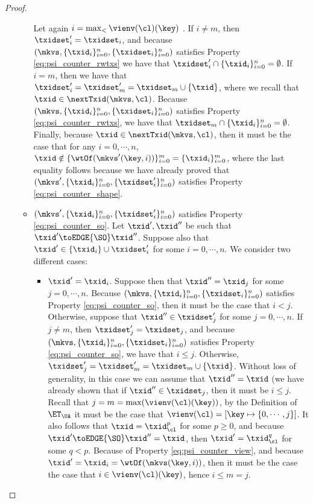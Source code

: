 \begin{proof}
\begin{itemize}
\begin{itemize}
Let again $i = \max_{<}\vienv(\cl)(\key)$ . 
If $i \neq m$, then $\txidset'_{i} = \txidset_{i}$, and because $(\mkvs,  \{\txid_{i}\}_{i=0}^{n}, \{\txidset_{i}\}_{i=0}^{n})$ 
satisfies Property \eqref{eq:psi_counter_rwtxs} 
we have that $\txidset'_{i} \cap \{\txid_{i}\}_{i=0}^{n} = \emptyset$. If $i = m$, then 
we have that $\txidset'_{i} = \txidset'_{m} = \txidset_{m} \cup \{\txid\}$, where we recall that $\txid \in \nextTxid(\mkvs, \cl)$. 
Because $(\mkvs,  \{\txid_{i}\}_{i=0}^{n}, \{\txidset_{i}\}_{i=0}^{n})$ 
satisfies Property \eqref{eq:psi_counter_rwtxs}, we have that $\txidset_{m} \cap \{\txid_{i}\}_{i=0}^{n} 
= \emptyset$. Finally, because $\txid \in \nextTxid(\mkvs,\cl)$, then it must be the case that 
for any $i = 0,\cdots, n$, $\txid \notin \{\wtOf(\mkvs'(\key,i))\}_{i=0}^{m} = \{\txid_{i}\}_{i=0}^{m}$,  
where the last equality follows because we have already proved that $(\mkvs',  \{\txid_{i}\}_{i=0}^{n}, \{\txidset'_{i}\}_{i=0}^{n})$ 
satisfies Property \eqref{eq:psi_counter_shape}.

\item $(\mkvs',  \{\txid_{i}\}_{i=0}^{n}, \{\txidset'_{i}\}_{i=0}^{n})$ satisfies Property \eqref{eq:psi_counter_so}. 
Let $\txid', \txid''$ be such that $\txid' \toEDGE{\SO} \txid''$. 
Suppose also that $\txid' \in \{\txid_{i}\} \cup \txidset'_{i}$ for some $i = 0,\cdots, n$. We consider two different cases:
\begin{itemize}
\item $\txid' = \txid_{i}$. Suppose then that $\txid'' = \txid_{j}$ for some $j = 0, \cdots, n$. Because 
$(\mkvs,  \{\txid_{i}\}_{i=0}^{n}, \{\txidset_{i}\}_{i=0}^{n})$ satisfies Property 
\eqref{eq:psi_counter_so}, then it must be the case that $i < j$. Otherwise, 
suppose that $\txid'' \in \txidset'_{j}$ for some $j=0,\cdots,n$. If $j \neq m$, then $\txidset'_{j} = \txidset_{j}$, 
and because $(\mkvs,  \{\txid_{i}\}_{i=0}^{n}, \{\txidset_{i}\}_{i=0}^{n})$ satisfies Property \eqref{eq:psi_counter_so}, we have that $i \leq j$. 
Otherwise, $\txidset'_{j} = \txidset'_{m} =  \txidset_{m} \cup \{\txid\}$. Without loss of generality, in this case 
we can assume that $\txid'' = \txid$ (we have already shown that if $\txid'' \in \txidset_{j}$, then 
it must be $i \leq j$. Recall that $j = m = \max(\vienv(\cl)(\key))$, by the Definition of 
$\ET_{\UA}$ it must be the case that $\vienv(\cl) = [\key \mapsto \{0,\cdots, j\}]$. 
It also follows that $\txid = \txid_{\cl}^{p}$ for some $p \geq 0$, and because $\txid' \toEDGE{\SO} \txid'' = \txid$, 
then $\txid' = \txid_{\cl}^{q}$ for some $q < p$. Because of Property 
\eqref{eq:psi_counter_view}, and because $\txid' = \txid_{i} = \wtOf(\mkvs(\key, i))$, then it must be the case the 
case that $i \in \vienv(\cl)(\key)$, hence  $i \leq m = j$.


\end{itemize}
\end{itemize}
\end{itemize}
\end{proof}

